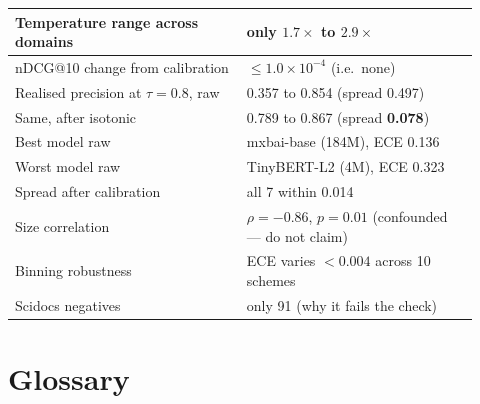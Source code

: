 \documentclass[11pt,a4paper]{article}
\begin{document}
\begin{table}[h]
\begin{tabular}{p{0.46\linewidth}p{0.46\linewidth}}
Temperature range across domains & only $1.7\times$ to $2.9\times$ \\
\midrule
\rowcolor{rowlight}
nDCG@10 change from calibration & $\leq 1.0\times10^{-4}$ (i.e.\ none) \\
Realised precision at $\tau{=}0.8$, raw & 0.357 to 0.854 (spread 0.497) \\
\rowcolor{rowlight}
Same, after isotonic & 0.789 to 0.867 (spread \textbf{0.078}) \\
\midrule
\rowcolor{rowlight}
Best model raw & mxbai-base (184M), ECE 0.136 \\
Worst model raw & TinyBERT-L2 (4M), ECE 0.323 \\
\rowcolor{rowlight}
Spread after calibration & all 7 within 0.014 \\
Size correlation & $\rho=-0.86$, $p=0.01$ (confounded --- do not claim) \\
\midrule
\rowcolor{rowlight}
Binning robustness & ECE varies $<0.004$ across 10 schemes \\
Scidocs negatives & only 91 (why it fails the check) \\
\bottomrule
\end{tabular}
\end{table}

\newpage
\section{Glossary}
\end{document}
